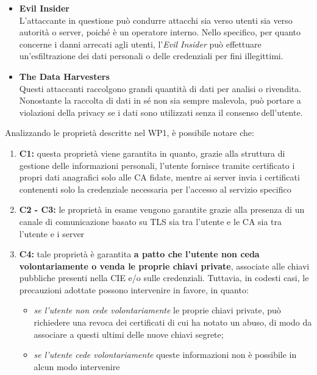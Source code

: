 \begin{itemize}
            \item \textbf{Evil Insider} \\
                L'attaccante in questione può condurre attacchi sia verso utenti sia verso autorità o server, poiché è un operatore interno.
                Nello specifico, per quanto concerne i danni arrecati agli utenti, l'\textit{Evil Insider} può effettuare un'esfiltrazione dei dati personali o delle credenziali per fini illegittimi.

            \item \textbf{The Data Harvesters} \\
                Questi attaccanti raccolgono grandi quantità di dati per analisi o rivendita.
                Nonostante la raccolta di dati in sé non sia sempre malevola, può portare a violazioni della privacy se i dati sono utilizzati senza il consenso dell'utente.
        \end{itemize}
        
        \noindent Analizzando le proprietà descritte nel WP1, è possibile notare che:
        
        \begin{enumerate}
            \item \textbf{C1:} questa proprietà viene garantita in quanto, grazie alla struttura di gestione delle informazioni personali, l’utente fornisce tramite certificato i propri dati anagrafici solo alle CA fidate, mentre ai server invia i certificati contenenti solo la credenziale necessaria per l'accesso al servizio specifico

            \item \textbf{C2 - C3:} le proprietà in esame vengono garantite grazie alla presenza di un canale di comunicazione basato su TLS sia tra l’utente e le CA sia tra l’utente e i server

            \item \textbf{C4:} tale proprietà è garantita \textbf{a patto che l’utente non ceda volontariamente o venda le proprie chiavi private}, associate alle chiavi pubbliche presenti nella CIE e/o sulle credenziali.
            Tuttavia, in codesti casi, le precauzioni adottate possono intervenire in favore, in quanto:
            \begin{itemize}
                \item \textit{se l’utente non cede volontariamente} le proprie chiavi private, può richiedere una revoca dei certificati di cui ha notato un abuso, di modo da associare a questi ultimi delle nuove chiavi segrete;

                \item \textit{se l’utente cede volontariamente} queste informazioni non è possibile in alcun modo intervenire
            \end{itemize}
        \end{enumerate}

